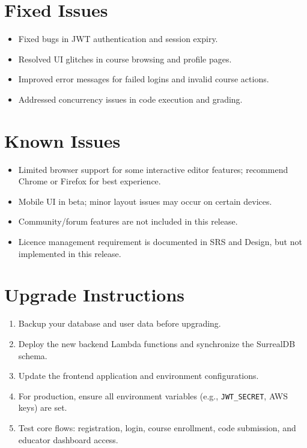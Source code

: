 \documentclass[a4paper,11pt]{scrartcl}
\begin{document}
\section{Fixed Issues}

\begin{itemize}[leftmargin=*]
    \item Fixed bugs in JWT authentication and session expiry.
    \item Resolved UI glitches in course browsing and profile pages.
    \item Improved error messages for failed logins and invalid course actions.
    \item Addressed concurrency issues in code execution and grading.
\end{itemize}

\section{Known Issues}

\begin{itemize}[leftmargin=*]
    \item Limited browser support for some interactive editor features; recommend Chrome or Firefox for best experience.
    \item Mobile UI in beta; minor layout issues may occur on certain devices.
    \item Community/forum features are not included in this release.
    \item Licence management requirement is documented in SRS and Design, but not implemented in this release.
\end{itemize}



\section{Upgrade Instructions}

\begin{enumerate}[leftmargin=*]
    \item Backup your database and user data before upgrading.
    \item Deploy the new backend Lambda functions and synchronize the SurrealDB schema.
    \item Update the frontend application and environment configurations.
    \item For production, ensure all environment variables (e.g., \texttt{JWT\_SECRET}, AWS keys) are set.
    \item Test core flows: registration, login, course enrollment, code submission, and educator dashboard access.
\end{enumerate}
\end{document}
